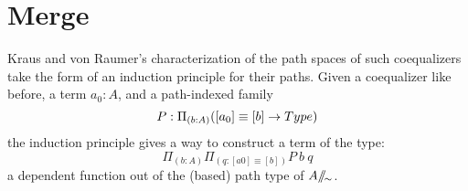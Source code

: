 \begin{code}%
\>[0]\AgdaSpace{}%
\AgdaSpace{}%
\AgdaSymbol{(}\AgdaSpace{}%
\AgdaSymbol{:}\AgdaSpace{}%
\AgdaSymbol{)}\AgdaSpace{}%
\<%
\\
\>[0][@{}l@{\AgdaIndent{0}}]%
\>[2]\AgdaSpace{}%
\AgdaSpace{}%
\AgdaSymbol{:}\AgdaSpace{}%
\AgdaSpace{}%
\<%
\\
\>[2][@{}l@{\AgdaIndent{0}}]%
\>[4]\AgdaSpace{}%
\AgdaSymbol{:}\AgdaSpace{}%
\<%
\\
%
\>[4]%
\>[12]\AgdaSymbol{:}\AgdaSpace{}%
\AgdaSpace{}%
\AgdaSpace{}%
\<%
\\
%
\\[\AgdaEmptyExtraSkip]%
%
\>[2]\AgdaSpace{}%
\AgdaSpace{}%
\AgdaSymbol{:}\AgdaSpace{}%
\AgdaSpace{}%
\<%
\\
\>[2][@{}l@{\AgdaIndent{0}}]%
\>[4]\AgdaOperator{\AgdaInductiveConstructor{[\AgdaUnderscore{}]}}\AgdaSpace{}%
\AgdaSymbol{:}\AgdaSpace{}%
\AgdaSpace{}%
\AgdaSpace{}%
\<%
\\
%
\>[4]%
\>[12]\AgdaSymbol{:}\AgdaSpace{}%
\AgdaSpace{}%
\AgdaSpace{}%
\AgdaSpace{}%
\AgdaOperator{\AgdaInductiveConstructor{[}}\AgdaSpace{}%
\AgdaSpace{}%
\AgdaOperator{\AgdaInductiveConstructor{]}}\AgdaSpace{}%
\AgdaSpace{}%
\AgdaOperator{\AgdaInductiveConstructor{[}}\AgdaSpace{}%
\AgdaSpace{}%
\AgdaSpace{}%
\AgdaOperator{\AgdaInductiveConstructor{]}}\<%
\end{code}

\section{Merge}

Kraus and von Raumer's characterization of the path spaces of such coequalizers
take the form of an induction principle for their paths. Given a coequalizer
like before, a term $a_0 : A$, and a path-indexed family
\[P : \Pi_{(b : A)} ([a_0] \equiv [b] \rightarrow Type)\]
the induction principle gives a way to construct a term of the type:
\[\Pi_{(b : A)} \Pi_{(q : [a0] \equiv [b])} P~b~q\]
a dependent function out of the (based) path type of $A /\!\!/\!_{\sim}$.

